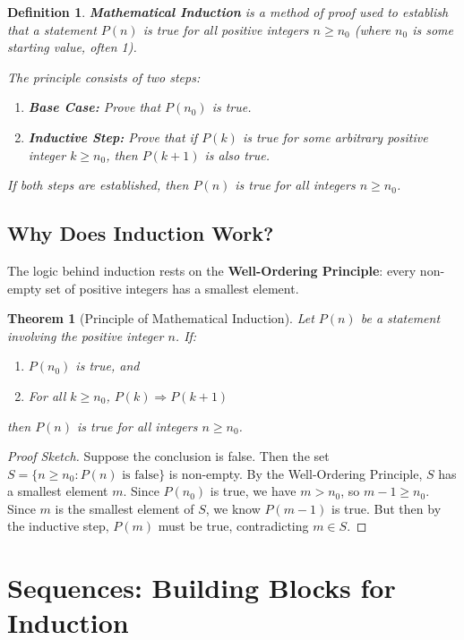 \documentclass[12pt]{article}
\newtheorem{definition}{Definition}
\newtheorem{theorem}{Theorem}
\begin{document}
\begin{definition}
\textbf{Mathematical Induction} is a method of proof used to establish that a statement $P(n)$ is true for all positive integers $n \geq n_0$ (where $n_0$ is some starting value, often 1).

The principle consists of two steps:
\begin{enumerate}
\item \textbf{Base Case:} Prove that $P(n_0)$ is true.
\item \textbf{Inductive Step:} Prove that if $P(k)$ is true for some arbitrary positive integer $k \geq n_0$, then $P(k+1)$ is also true.
\end{enumerate}

If both steps are established, then $P(n)$ is true for all integers $n \geq n_0$.
\end{definition}

\subsection{Why Does Induction Work?}

The logic behind induction rests on the \textbf{Well-Ordering Principle}: every non-empty set of positive integers has a smallest element.

\begin{theorem}[Principle of Mathematical Induction]
Let $P(n)$ be a statement involving the positive integer $n$. If:
\begin{enumerate}
\item $P(n_0)$ is true, and
\item For all $k \geq n_0$, $P(k) \Rightarrow P(k+1)$
\end{enumerate}
then $P(n)$ is true for all integers $n \geq n_0$.
\end{theorem}

\begin{proof}[Proof Sketch]
Suppose the conclusion is false. Then the set $S = \{n \geq n_0 : P(n) \text{ is false}\}$ is non-empty. By the Well-Ordering Principle, $S$ has a smallest element $m$. Since $P(n_0)$ is true, we have $m > n_0$, so $m-1 \geq n_0$. Since $m$ is the smallest element of $S$, we know $P(m-1)$ is true. But then by the inductive step, $P(m)$ must be true, contradicting $m \in S$.
\end{proof}

\section{Sequences: Building Blocks for Induction}
\end{document}
